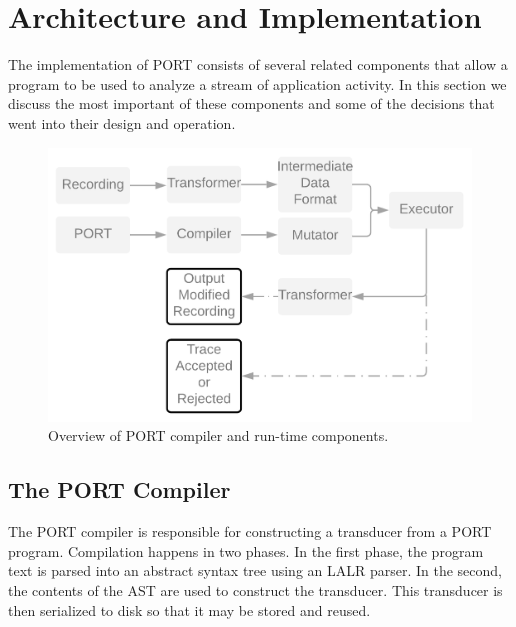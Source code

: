 \section{Architecture and Implementation}

The implementation of PORT consists of several related 
components that allow a program to be used to analyze a stream of
application activity.
In this section we discuss the most important of these components and some
of the decisions that went into their design and operation.

\label{SEC:architecture}

\begin{figure}
  \includegraphics[scale=.19]{images/architecture}
  \caption{Overview of PORT compiler and run-time components.}
  \label{fig:architecture}
\end{figure}

\subsection{The PORT Compiler}

The PORT compiler is responsible for constructing a transducer
from a PORT program.
Compilation happens in two phases.  In the first phase, the program text is
parsed into an abstract syntax tree using an LALR parser.
In the second, the
contents of the AST are used to construct the transducer.
This transducer is then serialized to
disk so that it may be stored and reused.

